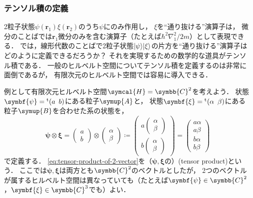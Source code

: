 \documentclass[
]{sotsu}
\newcommand{\bpsi}{\symbf{\psi}}
\newcommand{\bxi}{\symbf{\xi}}
\begin{document}
\subsubsection{テンソル積の定義}

2粒子状態$\psi(\symbf{r}_1) \xi(\symbf{r}_2)$のうち$\psi$にのみ作用し，
$\xi$を``通り抜ける''演算子は，
微分のことばでは$\symbf{r}_1$微分のみを含む演算子（たとえば$\hbar^2 \nabla_1^2 / 2 m$）として表現できる．
では，線形代数のことばで2粒子状態$\ket{\psi} \ket{\xi}$の片方を``通り抜ける''演算子はどのように定義できるだろうか？\quad 
それを実現するための数学的な道具がテンソル積である．
一般のヒルベルト空間についてテンソル積を定義するのは非常に面倒であるが，
有限次元のヒルベルト空間では容易に導入できる．

例として有限次元ヒルベルト空間$\symcal{H} = \symbb{C}^2$を考えよう．
状態$\bpsi = \cvector{a ; b}$にある粒子$\symup{A}$と，
状態$\bxi = \cvector{\alpha ; \beta}$にある粒子$\symup{B}$を合わせた系の状態を，
\begin{equation}
    \label{eq:tensor-product-of-2-vector}
    \bpsi \otimes \bxi
        = 
        \begin{pmatrix}
            a  \\  b
        \end{pmatrix}
        \otimes 
        \begin{pmatrix}
            \alpha  \\  \beta
        \end{pmatrix}
        \coloneq
        \begin{pmatrix}
            a
            \begin{pmatrix}
                \alpha  \\  \beta
            \end{pmatrix}
            \\
            b
            \begin{pmatrix}
                \alpha  \\  \beta
            \end{pmatrix}
        \end{pmatrix}
        = 
        \begin{pmatrix}
            a \alpha  \\  a \beta  \\  b \alpha  \\  b \beta
        \end{pmatrix}
\end{equation}
で定義する．
\cref{eq:tensor-product-of-2-vector}を（$\bpsi, \bxi$の）(tensor product)という．
ここでは$\bpsi, \bxi$は両方とも$\symbb{C}^2$のベクトルとしたが，
2つのベクトルが属するヒルベルト空間は異なっていても（たとえば$\bpsi \in \symbb{C}^2$，$\bxi \in \symbb{C}^3$でも）よい．
\end{document}
